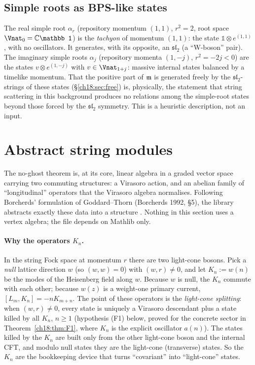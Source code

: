 \subsection{Simple roots as BPS-like states}

The real simple root $\alpha_r$ (repository momentum $(1,1)$, $r^2=2$, root space $\Vnat_0=\mathbb
C\mathbb 1$) is the \emph{tachyon} of momentum $(1,1)$: the state $\mathbb 1\otimes e^{(1,1)}$, with
no oscillators.  It generates, with its opposite, an $\mathfrak{sl}_2$ (a ``W-boson'' pair).  The
imaginary simple roots $\alpha_j$ (repository momenta $(1,-j)$, $r^2=-2j<0$) are the states
$v\otimes e^{(1,-j)}$ with $v\in\Vnat_{1+j}$: massive internal states balanced by a timelike momentum.
That the positive part of $\mathfrak{m}$ is generated freely by the $\mathfrak{sl}_2$-strings of these
states (\S\ref{ch18:sec:free}) is, physically, the statement that string scattering in this background
produces no relations among the simple-root states beyond those forced by the $\mathfrak{sl}_2$
symmetry.  This is a heuristic description, not an input.

\section{Abstract string modules}\label{ch18:sec:stringmodule}

The no-ghost theorem is, at its core, linear algebra in a graded vector space carrying two commuting
structures: a Virasoro action, and an abelian family of ``longitudinal'' operators that the Virasoro
algebra normalises.  Following Borcherds' formulation of Goddard--Thorn (Borcherds 1992, §5), the library abstracts
exactly these data into a structure .  Nothing in this section uses a vertex algebra; the file
depends on Mathlib only.

\paragraph{Why the operators $K_n$.}  In the string Fock space at momentum $r$ there are two light-cone bosons.  Pick a
\emph{null} lattice direction $w$ (so $(w,w)=0$) with $(w,r)\neq0$, and let $K_n:=w(n)$ be the modes of the Heisenberg field
along $w$.  Because $w$ is null, the $K_n$ commute with each other; because $w(z)$ is a weight-one primary current,
$[L_m,K_n]=-nK_{m+n}$.  The point of these operators is the \emph{light-cone splitting}: when $(w,r)\neq0$, every state is
uniquely a Virasoro descendant plus a state killed by all $K_n$, $n\ge1$ (hypothesis (F1) below, proved for the concrete
sector in Theorem~\ref{ch18:thm:F1}, where $K_n$ is the explicit oscillator $a(n)$).  The states killed by the $K_n$ are
built only from the other light-cone boson and the internal CFT, and modulo null states they are the light-cone
(transverse) states.  So the $K_n$ are the bookkeeping device that turns ``covariant'' into ``light-cone'' states.

